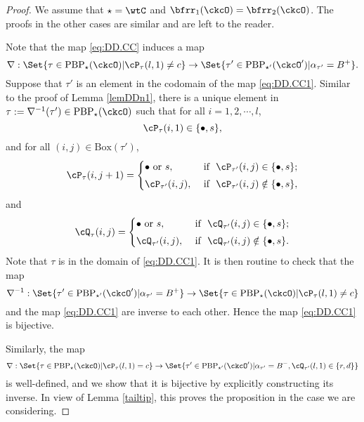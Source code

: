 \documentclass[12pt,a4paper]{amsart}
\numberwithin{equation}{section}
\theoremstyle{remark}
\def\ckcOp{\ckcO^{\prime}}
\def\BOX{\mathrm{Box}}
\def\PBP{\mathrm{PBP}}
\begin{document}
\begin{proof}
We assume that $\star = \wtC$ and $\bfrr_1(\ckcO)=\bfrr_2(\ckcO)$. The proofs in the other  cases are similar and are left to the reader.

Note that the map \eqref{eq:DD.CC} induces a map
\begin{equation}\label{eq:DD.CC1}
\nabla: \Set{\tau\in \PBP_{\star}(\ckcO)| \cP_\tau(l,1)\neq c}\rightarrow \Set{\tau'\in \PBP_{\star'}(\ckcOp)|  \alpha_{\tau'}=B^+}.
\end{equation}
Suppose that $\tau'$ is an element  in the codomain of the map \eqref{eq:DD.CC1}. Similar to the proof of Lemma \ref{lemDDn1}, there is a unique element in $\tau:=\nabla^{-1}(\tau')\in \PBP_{\star}(\ckcO)$ such that
for all $i=1,2, \cdots,l$,
\[
  \cP_{\tau}(i,1)\in \{\bullet, s\},
\]
and
for all $(i,j)\in \BOX(\tau')$,
\begin{equation}
     \cP_\tau(i,j+1)=\begin{cases}
    \bullet \textrm{ or } s,&\textrm{ if  $\ \cP_{\tau'}(i,j)\in \{\bullet, s\}$;} \smallskip \\
  \cP_{\tau'}(i,j),& \textrm{ if $\ \cP_{\tau'}(i,j)\notin \{\bullet, s\}$},\end{cases}
   \end{equation}
 and
   \begin{equation}
     \cQ_\tau(i,j)=\begin{cases}
    \bullet \textrm{ or } s,&\textrm{ if  $\ \cQ_{\tau'}(i,j)\in \{\bullet, s\}$;} \smallskip \\
  \cQ_{\tau'}(i,j), & \textrm{ if $\ \cQ_{\tau'}(i,j)\notin \{\bullet, s\}$}.  \end{cases}
   \end{equation}
Note that $\tau$ is in the domain of \eqref{eq:DD.CC1}. It is then routine to check that the map
\[
  \nabla^{-1}: \Set{\tau'\in \PBP_{\star'}(\ckcOp)|  \alpha_{\tau'}=B^+} \rightarrow  \Set{\tau\in \PBP_{\star}(\ckcO)| \cP_\tau(l,1)\neq c}
\]
and the map \eqref{eq:DD.CC1} are inverse to each other. Hence the map \eqref{eq:DD.CC1} is bijective.


Similarly, the map
\[
\nabla: \Set{\tau\in \PBP_{\star}(\ckcO)| \cP_\tau(l,1)= c}\rightarrow \Set{\tau'\in \PBP_{\star'}(\ckcOp)| \alpha_{\tau'}=B^-, \cQ_{\tau'}(l,1)\in\{r,d\}}
\]
is well-defined, and we show that it is bijective by explicitly  constructing its inverse. In view of Lemma \ref{tailtip}, this proves the proposition in the case we are considering.


\end{proof}
\end{document}
